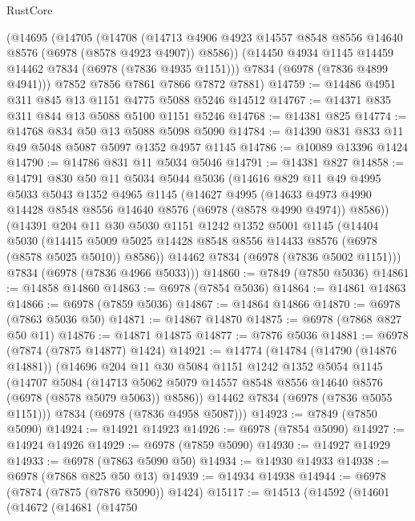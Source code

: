 \begin{lexlean}{RustCore}
\begin{coremodule}
    (@14695
      (@14705
        (@14708
          (@14713 @4906 @4923 @14557 @8548 @8556 @14640 @8576 (@6978 (@8578 @4923 @4907)) @8586))
        (@14450 @4934 @1145 @14459 @14462 @7834 (@6978 (@7836 @4935 @1151)))
        @7834
        (@6978 (@7836 @4899 @4941)))
      @7852
      @7856
      @7861
      @7866
      @7872
      @7881)
@14759 := @14486 @4951 @311 @845 @13 @1151 @4775 @5088 @5246 @14512
@14767 := @14371 @835 @311 @844 @13 @5088 @5100 @1151 @5246
@14768 := @14381 @825
@14774 := @14768 @834 @50 @13 @5088 @5098 @5090
@14784 := @14390 @831 @833 @11 @49 @5048 @5087 @5097 @1352 @4957 @1145
@14786 := @10089 @13396 @1424
@14790 := @14786 @831 @11 @5034 @5046
@14791 := @14381 @827
@14858 := @14791
    @830
    @50
    @11
    @5034
    @5044
    @5036
    (@14616
      @829
      @11
      @49
      @4995
      @5033
      @5043
      @1352
      @4965
      @1145
      (@14627
        @4995
        (@14633 @4973 @4990 @14428 @8548 @8556 @14640 @8576 (@6978 (@8578 @4990 @4974)) @8586))
      (@14391
        @204
        @11
        @30
        @5030
        @1151
        @1242
        @1352
        @5001
        @1145
        (@14404
          @5030
          (@14415 @5009 @5025 @14428 @8548 @8556 @14433 @8576 (@6978 (@8578 @5025 @5010)) @8586))
        @14462
        @7834
        (@6978 (@7836 @5002 @1151)))
      @7834
      (@6978 (@7836 @4966 @5033)))
@14860 := @7849 (@7850 @5036)
@14861 := @14858 @14860
@14863 := @6978 (@7854 @5036)
@14864 := @14861 @14863
@14866 := @6978 (@7859 @5036)
@14867 := @14864 @14866
@14870 := @6978 (@7863 @5036 @50)
@14871 := @14867 @14870
@14875 := @6978 (@7868 @827 @50 @11)
@14876 := @14871 @14875
@14877 := @7876 @5036
@14881 := @6978 (@7874 (@7875 @14877) @1424)
@14921 := @14774
    (@14784
      (@14790 (@14876 @14881))
      (@14696
        @204
        @11
        @30
        @5084
        @1151
        @1242
        @1352
        @5054
        @1145
        (@14707
          @5084
          (@14713 @5062 @5079 @14557 @8548 @8556 @14640 @8576 (@6978 (@8578 @5079 @5063)) @8586))
        @14462
        @7834
        (@6978 (@7836 @5055 @1151)))
      @7834
      (@6978 (@7836 @4958 @5087)))
@14923 := @7849 (@7850 @5090)
@14924 := @14921 @14923
@14926 := @6978 (@7854 @5090)
@14927 := @14924 @14926
@14929 := @6978 (@7859 @5090)
@14930 := @14927 @14929
@14933 := @6978 (@7863 @5090 @50)
@14934 := @14930 @14933
@14938 := @6978 (@7868 @825 @50 @13)
@14939 := @14934 @14938
@14944 := @6978 (@7874 (@7875 (@7876 @5090)) @1424)
@15117 := @14513
    (@14592
      (@14601
        (@14672
          (@14681
            (@14750

\end{coremodule}
\end{lexlean}
